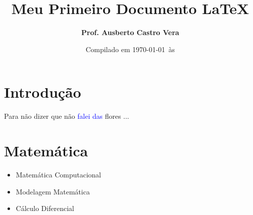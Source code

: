 \documentclass[article,  12pt, brazil]{abntex2}
\title{ Meu Primeiro Documento                \color{red} \LaTeX }
\author{   \textbf{Prof. Ausberto Castro Vera}
       }
\date{Compilado em \today\ \`{a}s \currenttime}    %
\begin{document}
\maketitle         %


\section{Introdu\c{c}\~{a}o}
Para n\~{a}o dizer que n\~{a}o \textcolor{blue}{falei das}     flores ...


\section{Matem\'{a}tica}

\begin{itemize}
  \item Matem\'{a}tica Computacional \cite{Yang2015}
  \item Modelagem Matem\'{a}tica \cite{Bassanezi2015}
  \item C\'{a}lculo Diferencial \cite{Guidorizzi2019}
\end{itemize}





\end{document}
